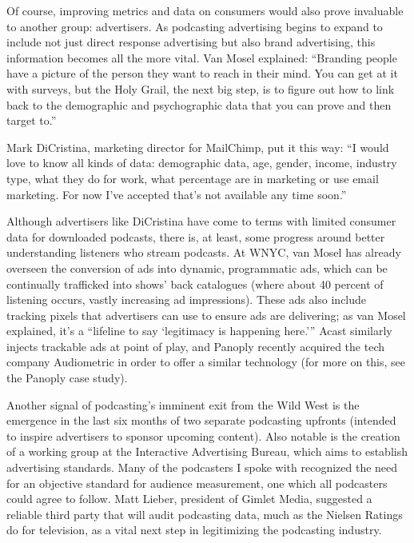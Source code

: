 \documentclass[notoc, symmetric, nobib, nols]{towcenter-guideto-book}
\begin{document}
Of course, improving metrics and data on consumers would also prove invaluable to another group: advertisers. As podcasting advertising begins to expand to include not just direct response advertising but also brand advertising, this information becomes all the more vital. Van Mosel explained: ``Branding people have a picture of the person they want to reach in their mind. You can get at it with surveys, but the Holy Grail, the next big step, is to figure out how to link back to the demographic and psychographic data that you can prove and then target to.''\autocite{mosel} 

Mark DiCristina, marketing director for MailChimp, put it this way: ``I would love to know all kinds of data: demographic data, age, gender, income, industry type, what they do for work, what percentage are in marketing or use email marketing. For now I've accepted that's not available any time soon.''\autocite{mailchimp}

Although advertisers like DiCristina have come to terms with limited consumer data for downloaded podcasts, there is, at least, some progress around better understanding listeners who stream podcasts. At WNYC, van Mosel has already overseen the conversion of ads into dynamic, programmatic ads, which can be continually trafficked into shows' back catalogues (where about 40 percent of listening occurs, vastly increasing ad impressions).\autocite{mosel} These ads also include tracking pixels that advertisers can use to ensure ads are delivering; as van Mosel explained, it's a ``lifeline to say `legitimacy is happening here.'''\autocite{mosel} Acast similarly injects trackable ads at point of play, and Panoply recently acquired the tech company Audiometric in order to offer a similar technology (for more on this, see the Panoply case study).

Another signal of podcasting's imminent exit from the Wild West is the emergence in the last six months of two separate podcasting upfronts (intended to inspire advertisers to sponsor upcoming content). Also notable is the creation of a working group at the Interactive Advertising Bureau, which aims to establish advertising standards. Many of the podcasters I spoke with recognized the need for an objective standard for audience measurement, one which all podcasters could agree to follow. Matt Lieber, president of Gimlet Media, suggested a reliable third party that will audit podcasting data, much as the Nielsen Ratings do for television, as a vital next step in legitimizing the podcasting industry.\autocite{lieber} 
\end{document}
